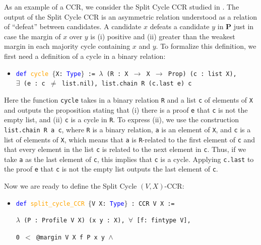 \documentclass[runningheads]{llncs}
\begin{document}
\begin{example}\label{SplitCycleEx1} As an example of a CCR, we consider the Split Cycle CCR studied in \cite{HP2020}. The output of the Split Cycle CCR is an asymmetric relation understood as a relation of ``defeat'' between candidates. A candidate $x$ defeats a candidate $y$ in $\mathbf{P}$ just in case the margin of $x$ over $y$ is (i) positive and (ii) greater than the weakest margin in each majority cycle containing $x$ and $y$. To formalize this definition, we first need a definition of a cycle in a binary relation:
\begin{itemize}
\item[] \texttt{\textcolor{blue}{def} \textcolor{orange}{cycle} $\{$X: \textcolor{blue}{Type}$\}$ := $\lambda$ (R : X $\to$ X $\to$ Prop) (c : list X), \\
$\exists$ (e : c $\neq$ list.nil), list.chain R (c.last e) c}
\end{itemize}
Here the function \texttt{cycle} takes in a binary relation \texttt{R} and a list \texttt{c} of elements of \texttt{X} and outputs the proposition stating that (i) there is a proof \texttt{e} that \texttt{c} is not the empty list, and (ii) \texttt{c} is a cycle in \texttt{R}. To express (ii), we use the construction \texttt{list.chain R a c}, where \texttt{R} is a binary relation, \texttt{a} is an element of \texttt{X}, and \texttt{c} is a list of elements of \texttt{X}, which means that \texttt{a} is \texttt{R}-related to the first element of \texttt{c} and that every element in the list \texttt{c} is related to the next element in \texttt{c}. Thus, if we take \texttt{a} as the last element of \texttt{c}, this implies that \texttt{c} is a cycle. Applying \texttt{c.last} to the proof \texttt{e} that \texttt{c} is not the empty list outputs the last element of \texttt{c}.

Now we are ready to define the Split Cycle $(V,X)$-CCR:
\begin{itemize}
\item[] \texttt{\textcolor{blue}{def} \textcolor{orange}{split\_cycle\_CCR} $\{$V X: \textcolor{blue}{Type}$\}$ : CCR V X :=} 

    \texttt{$\lambda$ (P : Profile V X) (x y : X), $\forall$ [f: fintype V],}
    
    \texttt{0 $<$ @margin V X f P x y $\wedge$}
    

\end{itemize}
\end{example}
\end{document}
